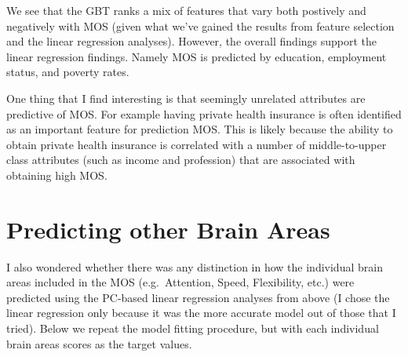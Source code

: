 \documentclass{article}
\begin{document}
    We see that the GBT ranks a mix of features that vary both postively and
negatively with MOS (given what we've gained the results from feature
selection and the linear regression analyses). However, the overall
findings support the linear regression findings. Namely MOS is predicted
by education, employment status, and poverty rates.

One thing that I find interesting is that seemingly unrelated attributes
are predictive of MOS. For example having private health insurance is
often identified as an important feature for prediction MOS. This is
likely because the ability to obtain private health insurance is
correlated with a number of middle-to-upper class attributes (such as
income and profession) that are associated with obtaining high MOS.

    \section{Predicting other Brain
Areas}\label{predicting-other-brain-areas}

I also wondered whether there was any distinction in how the individual
brain areas included in the MOS (e.g.~Attention, Speed, Flexibility,
etc.) were predicted using the PC-based linear regression analyses from
above (I chose the linear regression only because it was the more
accurate model out of those that I tried). Below we repeat the model
fitting procedure, but with each individual brain areas scores as the
target values.
\end{document}

